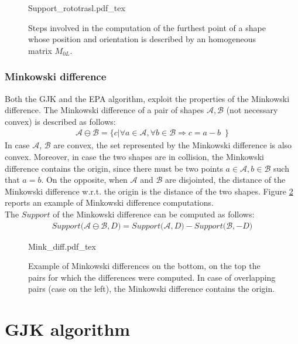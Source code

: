 \documentclass{article}
\begin{document}
\begin{figure}
	\centering
\def\svgwidth{0.95 \columnwidth}
{Support_rototrasl.pdf_tex} 
	\caption{Steps involved in the computation of the furthest point of a shape whose position and orientation is described by an homogeneous matrix $M_{0L}$. }
	\label{fig:Support_om}
\end{figure} 

\subsubsection{Minkowski difference}

Both the GJK and the EPA algorithm, exploit the properties of the Minkowski difference. The Minkowski difference of a pair of shapes $\mathcal{A}, \mathcal{B}$ (not necessary convex) is described as follows:
\begin{eqnarray}
\mathcal{A} \ominus \mathcal{B} = \bigg \lbrace c \bigg| \forall a\in \mathcal{A}, \forall b\in \mathcal{B} \Rightarrow c=a-b \,\,\,   \bigg \rbrace
\end{eqnarray}
In case $\mathcal{A}$, $\mathcal{B}$ are convex, the set represented by the Minkowski difference is also convex. Moreover, in case the two shapes are in collision, the Minkowski difference contains the origin, since there must be two points $a\in\mathcal{A},b\in\mathcal{B}$ such that $a=b$.
On the opposite, when $\mathcal{A}$ and $\mathcal{B}$ are disjointed, the distance of the Minkowski difference w.r.t. the origin is the distance of the two shapes. Figure \ref{fig:Mink_diff} reports an example of Minkowski difference computations.
\\
The $Support$ of the Minkowski difference can be computed as follows:
\begin{eqnarray}
Support \bigg( \mathcal{A} \ominus \mathcal{B} , D \bigg) =
Support \bigg( \mathcal{A} , D \bigg) - Support \bigg( \mathcal{B} , -D \bigg)
\label{eq:Mink_supp}
\end{eqnarray}

\begin{figure}
	\centering
\def\svgwidth{0.95 \columnwidth}
{Mink_diff.pdf_tex} 
	\caption{Example of Minkowski differences on the bottom, on the top the pairs for which the differences were computed. In case of overlapping pairs (case on the left), the Minkowski difference contains the origin. }
	\label{fig:Mink_diff}
\end{figure} 

\section{GJK algorithm}
\label{Sec:cases}
\end{document}
